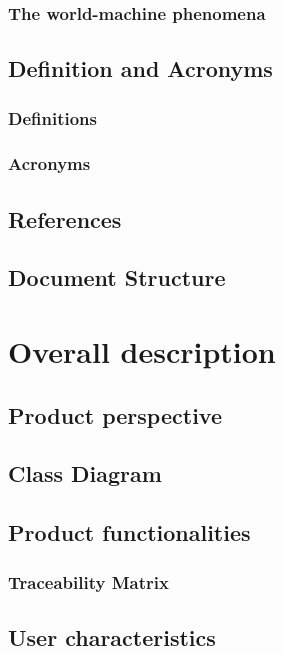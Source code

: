 \documentclass[12pt]{article}
\begin{document}
	\subsubsection{The world-machine phenomena}
	
	\clearpage
	\subsection{Definition and Acronyms}
	\subsubsection{Definitions}
	
	\subsubsection{Acronyms}
	
	\subsection{References}
	
	\subsection{Document Structure}
	
	\clearpage
	\section{Overall description}
	\subsection{Product perspective}
	
	\subsection{Class Diagram}
	
	\subsection{Product functionalities}
	
	\subsubsection{Traceability Matrix}
	
	\subsection{User characteristics}
	
	
\end{document}

